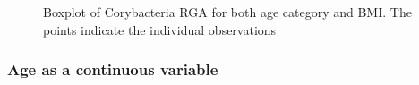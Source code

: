 \begin{figure}
    \centering
     \resizebox{\hsize}{!}{%
       
    }
    \caption{Boxplot of Corybacteria RGA for both age category and BMI. The points indicate the individual observations}
    \label{fig:BoxplotBMIAge}
\end{figure}


\subsubsection{Age as a continuous variable}


